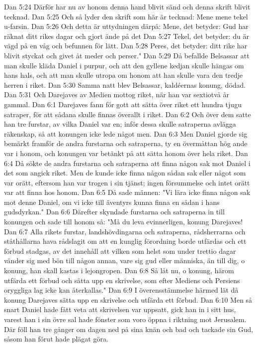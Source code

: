 Dan 5:24  Därför har nu av honom denna hand blivit sänd och denna skrift blivit tecknad.
Dan 5:25  Och så lyder den skrift som här är tecknad: Mene mene tekel u-farsin.
Dan 5:26  Och detta är uttydningen därpå: Mene, det betyder: Gud har räknat ditt rikes dagar och gjort ände på det
Dan 5:27  Tekel, det betyder: du är vägd på en våg och befunnen för lätt.
Dan 5:28  Peres, det betyder: ditt rike har blivit styckat och givet åt meder och perser."
Dan 5:29  Då befallde Belsassar att man skulle kläda Daniel i purpur, och att den gyllene kedjan skulle hängas om hans hals, och att man skulle utropa om honom att han skulle vara den tredje herren i riket.
Dan 5:30  Samma natt blev Belsassar, kaldéernas konung, dödad.
Dan 5:31  Och Darejaves av Medien mottog riket, när han var sextiotvå år gammal.
Dan 6:1  Darejaves fann för gott att sätta över riket ett hundra tjugu satraper, för att sådana skulle finnas överallt i riket.
Dan 6:2  Och över dem satte han tre furstar, av vilka Daniel var en; inför dessa skulle satraperna avlägga räkenskap, så att konungen icke lede något men.
Dan 6:3  Men Daniel gjorde sig bemärkt framför de andra furstarna och satraperna, ty en övermåttan hög ande var i honom, och konungen var betänkt på att sätta honom över hela riket.
Dan 6:4  Då sökte de andra furstarna och satraperna att finna någon sak mot Daniel i det som angick riket. Men de kunde icke finna någon sådan sak eller något som var orätt, eftersom han var trogen i sin tjänst; ingen försummelse och intet orätt var att finna hos honom.
Dan 6:5  Då sade männen: "Vi lära icke finna någon sak mot denne Daniel, om vi icke till äventyrs kunna finna en sådan i hans gudsdyrkan."
Dan 6:6  Därefter skyndade furstarna och satraperna in till konungen och sade till honom så: "Må du leva evinnerligen, konung Darejaves!
Dan 6:7  Alla rikets furstar, landshövdingarna och satraperna, rådsherrarna och ståthållarna hava rådslagit om att en kunglig förordning borde utfärdas och ett förbud stadgas, av det innehåll att vilken som helst som under trettio dagar vänder sig med bön till någon annan, vare sig gud eller människa, än till dig, o konung, han skall kastas i lejongropen.
Dan 6:8  Så låt nu, o konung, härom utfärda ett förbud och sätta upp en skrivelse, som efter Mediens och Persiens oryggliga lag icke kan återkallas."
Dan 6:9  I överensstämmelse härmed lät då konung Darejaves sätta upp en skrivelse och utfärda ett förbud.
Dan 6:10  Men så snart Daniel hade fått veta att skrivelsen var uppsatt, gick han in i sitt hus, varest han i sin övre sal hade fönster som voro öppna i riktning mot Jerusalem. Där föll han tre gånger om dagen ned på sina knän och bad och tackade sin Gud, såsom han förut hade plägat göra.

